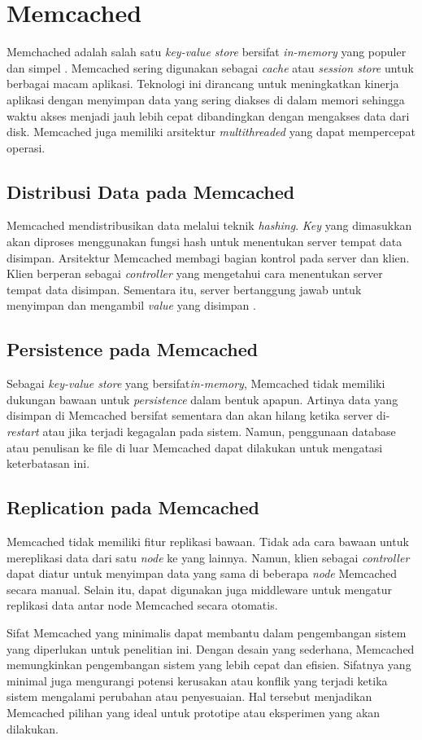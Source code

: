 \section{Memcached}

Memchached adalah salah satu \textit{key-value store} bersifat \textit{in-memory} yang populer dan simpel \parencite{nishtala2013scaling}. Memcached sering digunakan sebagai \textit{cache} atau \textit{session store} untuk berbagai macam aplikasi. Teknologi ini dirancang untuk meningkatkan kinerja aplikasi dengan menyimpan data yang sering diakses di dalam memori sehingga waktu akses menjadi jauh lebih cepat dibandingkan dengan mengakses data dari disk. Memcached juga memiliki arsitektur \textit{multithreaded} yang dapat mempercepat operasi.

\subsection{Distribusi Data pada Memcached}
Memcached mendistribusikan data melalui teknik \textit{hashing}. \textit{Key} yang dimasukkan akan diproses menggunakan fungsi hash untuk menentukan server tempat data disimpan. Arsitektur Memcached membagi bagian kontrol pada server dan klien. Klien berperan sebagai \textit{controller} yang mengetahui cara menentukan server tempat data disimpan. Sementara itu, server bertanggung jawab untuk menyimpan dan mengambil \textit{value} yang disimpan \parencite{memcached_documentation}.

\subsection{Persistence pada Memcached}
Sebagai \textit{key-value store} yang bersifat\textit{in-memory}, Memcached tidak memiliki dukungan bawaan untuk \textit{persistence} dalam bentuk apapun. Artinya data yang disimpan di Memcached bersifat sementara dan akan hilang ketika server di-\textit{restart} atau jika terjadi kegagalan pada sistem. Namun, penggunaan database atau penulisan ke file di luar Memcached dapat dilakukan untuk mengatasi keterbatasan ini.

\subsection{Replication pada Memcached}
Memcached tidak memiliki fitur replikasi bawaan. Tidak ada cara bawaan untuk mereplikasi data dari satu \textit{node} ke yang lainnya. Namun, klien sebagai \textit{controller} dapat diatur untuk menyimpan data yang sama di beberapa \textit{node} Memcached secara manual. Selain itu, dapat digunakan juga middleware untuk mengatur replikasi data antar node Memcached secara otomatis.

Sifat Memcached yang minimalis dapat membantu dalam pengembangan sistem yang diperlukan untuk penelitian ini. Dengan desain yang sederhana, Memcached memungkinkan pengembangan sistem yang lebih cepat dan efisien. Sifatnya yang minimal juga mengurangi potensi kerusakan atau konflik yang terjadi ketika sistem mengalami perubahan atau penyesuaian. Hal tersebut menjadikan Memcached pilihan yang ideal untuk prototipe atau eksperimen yang akan dilakukan.
